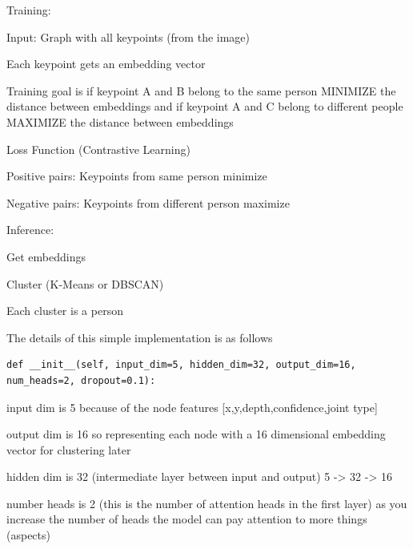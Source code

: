 Training:

\begin{compactitem}
	\item Input: Graph with all keypoints (from the image) 
	\item Each keypoint gets an embedding vector 
\end{compactitem}

Training goal is if keypoint A and B belong to the same person MINIMIZE the distance between embeddings
and if keypoint A and C belong to different people MAXIMIZE the distance between embeddings

Loss Function (Contrastive Learning)


\begin{compactitem}
	\item Positive pairs: Keypoints from same person minimize 
	\item Negative pairs: Keypoints from different person maximize 
\end{compactitem}

Inference:

\begin{compactitem}
	\item Get embeddings 
	\item Cluster (K-Means or DBSCAN)
	\item Each cluster is a person
\end{compactitem}

The details of this simple implementation is as follows

\begin{lstlisting}[style=pythonstyle,title={Simple GAT Init},label={code:pyg_simple_gat_init}]
def __init__(self, input_dim=5, hidden_dim=32, output_dim=16, num_heads=2, dropout=0.1):
\end{lstlisting}

input dim is 5 because of the node features [x,y,depth,confidence,joint type]

output dim is 16 so representing each node with a 16 dimensional embedding vector for clustering later

hidden dim is 32 (intermediate layer between input and output) 5 -> 32 -> 16

number heads is 2 (this is the number of attention heads in the first layer) as you increase the number of heads the model can pay
attention to more things (aspects)

